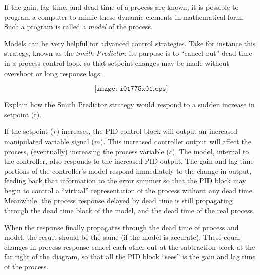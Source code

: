 

If the gain, lag time, and dead time of a process are known, it is possible to program a computer to mimic these dynamic elements in mathematical form.  Such a program is called a {\it model} of the process.

Models can be very helpful for advanced control strategies.  Take for instance this strategy, known as the {\it Smith Predictor}: its purpose is to ``cancel out'' dead time in a process control loop, so that setpoint changes may be made without overshoot or long response lags.

$$\texttt{[image: i01775x01.eps]}$$

Explain how the Smith Predictor strategy would respond to a sudden increase in setpoint (r).







If the setpoint ($r$) increases, the PID control block will output an increased manipulated variable signal ($m$).  This increased controller output will affect the process, (eventually) increasing the process variable ($c$).  The model, internal to the controller, also responds to the increased PID output.  The gain and lag time portions of the controller's model respond immediately to the change in output, feeding back that information to the error summer so that the PID block may begin to control a ``virtual'' representation of the process without any dead time.  Meanwhile, the process response delayed by dead time is still propagating through the dead time block of the model, and the dead time of the real process.

When the response finally propagates through the dead time of process and model, the result should be the same (if the model is accurate).  These equal changes in process response cancel each other out at the subtraction block at the far right of the diagram, so that all the PID block ``sees'' is the gain and lag time of the process.







